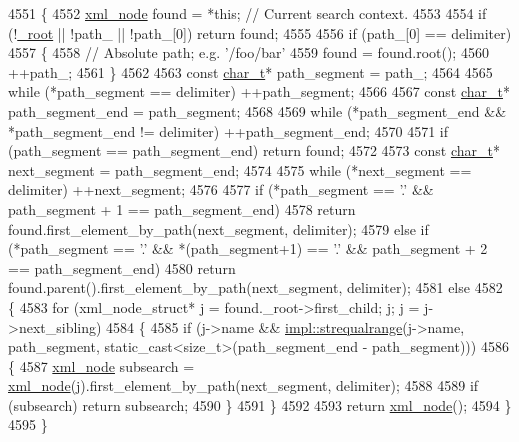 \begin{DoxyCode}
4551     \{
4552         \hyperlink{classpugi_1_1xml__node_a36ec0eb8b399d71f6b55be0e181c69f9}{xml\_node} found = *\textcolor{keyword}{this}; \textcolor{comment}{// Current search context.}
4553 
4554         \textcolor{keywordflow}{if} (!\hyperlink{classpugi_1_1xml__node_a45a5b342de1e37a60565f7693f03cc08}{\_root} || !path\_ || !path\_[0]) \textcolor{keywordflow}{return} found;
4555 
4556         \textcolor{keywordflow}{if} (path\_[0] == delimiter)
4557         \{
4558             \textcolor{comment}{// Absolute path; e.g. '/foo/bar'}
4559             found = found.root();
4560             ++path\_;
4561         \}
4562 
4563         \textcolor{keyword}{const} \hyperlink{namespacepugi_aef5a7a62cba0507542220ea15afe39df}{char\_t}* path\_segment = path\_;
4564 
4565         \textcolor{keywordflow}{while} (*path\_segment == delimiter) ++path\_segment;
4566 
4567         \textcolor{keyword}{const} \hyperlink{namespacepugi_aef5a7a62cba0507542220ea15afe39df}{char\_t}* path\_segment\_end = path\_segment;
4568 
4569         \textcolor{keywordflow}{while} (*path\_segment\_end && *path\_segment\_end != delimiter) ++path\_segment\_end;
4570 
4571         \textcolor{keywordflow}{if} (path\_segment == path\_segment\_end) \textcolor{keywordflow}{return} found;
4572 
4573         \textcolor{keyword}{const} \hyperlink{namespacepugi_aef5a7a62cba0507542220ea15afe39df}{char\_t}* next\_segment = path\_segment\_end;
4574 
4575         \textcolor{keywordflow}{while} (*next\_segment == delimiter) ++next\_segment;
4576 
4577         \textcolor{keywordflow}{if} (*path\_segment == \textcolor{charliteral}{'.'} && path\_segment + 1 == path\_segment\_end)
4578             \textcolor{keywordflow}{return} found.first\_element\_by\_path(next\_segment, delimiter);
4579         \textcolor{keywordflow}{else} \textcolor{keywordflow}{if} (*path\_segment == \textcolor{charliteral}{'.'} && *(path\_segment+1) == \textcolor{charliteral}{'.'} && path\_segment + 2 == path\_segment\_end)
4580             \textcolor{keywordflow}{return} found.parent().first\_element\_by\_path(next\_segment, delimiter);
4581         \textcolor{keywordflow}{else}
4582         \{
4583             \textcolor{keywordflow}{for} (xml\_node\_struct* j = found.\_root->first\_child; j; j = j->next\_sibling)
4584             \{
4585                 \textcolor{keywordflow}{if} (j->name && \hyperlink{pugixml_8cpp_abbf171d1eb53f93f1fa710de5673f889}{impl::strequalrange}(j->name, path\_segment, 
      static\_cast<size\_t>(path\_segment\_end - path\_segment)))
4586                 \{
4587                     \hyperlink{classpugi_1_1xml__node_a36ec0eb8b399d71f6b55be0e181c69f9}{xml\_node} subsearch = \hyperlink{classpugi_1_1xml__node_a36ec0eb8b399d71f6b55be0e181c69f9}{xml\_node}(j).first\_element\_by\_path(next\_segment, 
      delimiter);
4588 
4589                     \textcolor{keywordflow}{if} (subsearch) \textcolor{keywordflow}{return} subsearch;
4590                 \}
4591             \}
4592 
4593             \textcolor{keywordflow}{return} \hyperlink{classpugi_1_1xml__node_a36ec0eb8b399d71f6b55be0e181c69f9}{xml\_node}();
4594         \}
4595     \}
\end{DoxyCode}
